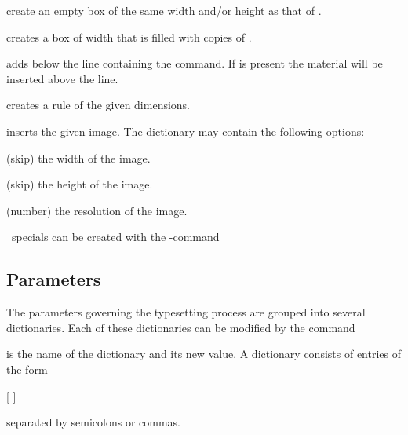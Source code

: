 \begin{code}
\cs{\phantom} 

\cs{\hphantom} 

\cs{\vphantom} 
\end{code}
create an empty box of the same width and/or height as that of .

\begin{code}
\cs{\hleaders}  
\end{code}
creates a box of width  that is filled with copies of .

\begin{code}
  \cs{\vadjust} \cs{*} 
\end{code}
adds  below the line containing the \cs{\vadjust} command. If \cs{*} is present the material
will be inserted above the line.

\begin{code}
  \cs{\rule}   
\end{code}
creates a rule of the given dimensions.

\begin{code}
  \cs{\image}  
\end{code}
inserts the given image. The  dictionary may contain the following options\?:
\begin{longdescription}
\item{\quad (skip)}  the width of the image.
\item{\quad (skip)} the height of the image.
\item{\quad (number)}  the resolution of the image.
\end{longdescription}

\dvi\ specials can be created with the \AL-command
\begin{code}
   
\end{code}


\subsection{Parameters}   %


The parameters governing the typesetting process are grouped into several dictionaries.
Each of these dictionaries can be modified by the command
\begin{code}
  \cs{\setparameter}  
\end{code}
 is the name of the dictionary and  its new value.
A dictionary consists of entries of the form
\begin{code}
   [\cs{=} ]
\end{code}
separated by semicolons or commas.

